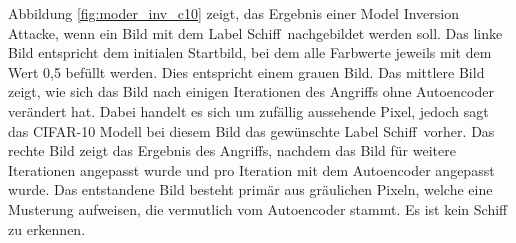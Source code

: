 Abbildung \ref{fig:moder_inv_c10} zeigt, das Ergebnis einer Model Inversion Attacke, wenn ein Bild mit dem Label \dq Schiff\dq\ nachgebildet werden soll.
Das linke Bild entspricht dem initialen Startbild, bei dem alle Farbwerte jeweils mit dem Wert 0,5 befüllt werden. 
Dies entspricht einem grauen Bild.
Das mittlere Bild zeigt, wie sich das Bild nach einigen Iterationen des Angriffs ohne Autoencoder verändert hat.
Dabei handelt es sich um zufällig aussehende Pixel, jedoch sagt das CIFAR-10 Modell bei diesem Bild das gewünschte Label \dq Schiff\dq\ vorher.
Das rechte Bild zeigt das Ergebnis des Angriffs, nachdem das Bild für weitere Iterationen angepasst wurde und pro Iteration mit dem Autoencoder angepasst wurde.
Das entstandene Bild besteht primär aus gräulichen Pixeln, welche eine Musterung aufweisen, die vermutlich vom Autoencoder stammt.
Es ist kein Schiff zu erkennen.
